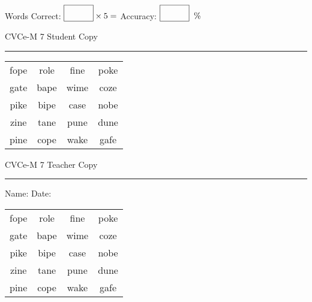 \documentclass{memoir}
\begin{document}
\small

Words Correct: $\fbox{\phantom{\huge 100}} \times 5 = $ Accuracy: $\fbox{\phantom{\huge 100}}\;\; \%$ 

\vfill

\newpage


\footnotesize \noindent
CVCe-M 7 \hfill Student Copy
\smallskip
\hrule

\Large

\setlength{\tabcolsep}{14pt}
\def\arraystretch{2}

{\selectfont


\begin{vplace}[0.5]
\begin{center}
\begin{tabular}{cccc}
fope & role & fine & poke \\
gate & bape & wime & coze \\
pike & bipe & case & nobe \\
zine & tane & pune & dune \\
pine & cope & wake & gafe \\
\end{tabular}
\end{center}
\end{vplace}

}

\newpage

\footnotesize \noindent
CVCe-M 7 \hfill Teacher Copy
\smallskip
\hrule

\small

\vfill

\noindent
Name: \underline{\hspace{1.75in}} \hfill Date: \underline{\hspace{1in}}

\Large

{\selectfont


\begin{vplace}[0.5]
\begin{center}
\begin{tabular}{cccc}
fope & role & fine & poke \\
gate & bape & wime & coze \\
pike & bipe & case & nobe \\
zine & tane & pune & dune \\
pine & cope & wake & gafe \\
\end{tabular}
\end{center}
\end{vplace}



}
\end{document}
